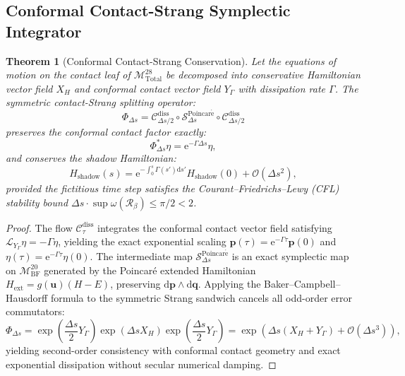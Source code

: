 \documentclass[11pt,a4paper,reqno]{article}
\theoremstyle{plain}
\newtheorem{theorem}{Theorem}[section]
\theoremstyle{definition}
\theoremstyle{remark}
\numberwithin{equation}{section}
\numberwithin{table}{section}
\newcommand{\MbfTwenty}{\mathcal{M}_{\mathrm{BF}}^{20}}
\newcommand{\Mtotal}{\mathcal{M}_{\mathrm{Total}}^{28}}
\providecommand{\diff}{\mathrm{d}}
\begin{document}
\subsection{Conformal Contact-Strang Symplectic Integrator}
\begin{theorem}[Conformal Contact-Strang Conservation]
Let the equations of motion on the contact leaf of $\Mtotal$ be decomposed into conservative Hamiltonian vector field $X_H$ and conformal contact vector field $Y_{\Gamma}$ with dissipation rate $\Gamma$. The symmetric contact-Strang splitting operator:
\begin{equation}
  \Phi_{\Delta s} = \mathcal{C}_{\Delta s/2}^{\mathrm{diss}} \circ \mathcal{S}_{\Delta s}^{\mathrm{Poincar\acute{e}}} \circ \mathcal{C}_{\Delta s/2}^{\mathrm{diss}}
  \label{eq:contact_strang_map}
\end{equation}
preserves the conformal contact factor exactly:
\begin{equation}
  \Phi_{\Delta s}^* \eta = \mathrm{e}^{-\Gamma \Delta s} \eta,
\end{equation}
and conserves the shadow Hamiltonian:
\begin{equation}
  H_{\mathrm{shadow}}(s) = \mathrm{e}^{-\int_0^s \Gamma(s') \diff s'} H_{\mathrm{shadow}}(0) + \mathcal{O}(\Delta s^2),
  \label{eq:shadow_energy_preservation}
\end{equation}
provided the fictitious time step satisfies the Courant--Friedrichs--Lewy (CFL) stability bound $\Delta s \cdot \sup \omega(\mathcal{R}_\beta) \le \pi/2 < 2$.
\end{theorem}

\begin{proof}
The flow $\mathcal{C}_{\tau}^{\mathrm{diss}}$ integrates the conformal contact vector field satisfying $\mathcal{L}_{Y_\Gamma} \eta = -\Gamma \eta$, yielding the exact exponential scaling $\bm{p}(\tau) = \mathrm{e}^{-\Gamma \tau} \bm{p}(0)$ and $\eta(\tau) = \mathrm{e}^{-\Gamma \tau} \eta(0)$. The intermediate map $\mathcal{S}_{\Delta s}^{\mathrm{Poincar\acute{e}}}$ is an exact symplectic map on $\MbfTwenty$ generated by the Poincar\'e extended Hamiltonian $H_{\mathrm{ext}} = g(\bm{u})(H - E)$, preserving $\diff \bm{p} \wedge \diff \bm{q}$. Applying the Baker--Campbell--Hausdorff formula to the symmetric Strang sandwich cancels all odd-order error commutators:
\begin{equation}
  \Phi_{\Delta s} = \exp\left( \frac{\Delta s}{2} Y_{\Gamma} \right) \exp\left( \Delta s X_H \right) \exp\left( \frac{\Delta s}{2} Y_{\Gamma} \right) = \exp\left( \Delta s (X_H + Y_{\Gamma}) + \mathcal{O}(\Delta s^3) \right),
\end{equation}
yielding second-order consistency with conformal contact geometry and exact exponential dissipation without secular numerical damping.
\end{proof}
\end{document}
